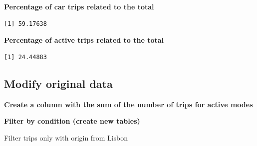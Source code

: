 \documentclass[
  letterpaper,
  DIV=11,
  numbers=noendperiod]{scrreprt}
\newenvironment{Shaded}{\begin{snugshade}}{\end{snugshade}}
\newcommand{\DecValTok}[1]{\textcolor[rgb]{0.68,0.00,0.00}{#1}}
\newcommand{\FunctionTok}[1]{\textcolor[rgb]{0.28,0.35,0.67}{#1}}
\newcommand{\NormalTok}[1]{\textcolor[rgb]{0.00,0.23,0.31}{#1}}
\newcommand{\OtherTok}[1]{\textcolor[rgb]{0.00,0.23,0.31}{#1}}
\newcommand{\SpecialCharTok}[1]{\textcolor[rgb]{0.37,0.37,0.37}{#1}}
\newcommand{\StringTok}[1]{\textcolor[rgb]{0.13,0.47,0.30}{#1}}
\begin{document}
\textbf{Percentage of car trips related to the total}

\begin{Shaded}
\end{Shaded}

\begin{verbatim}
[1] 59.17638
\end{verbatim}

\textbf{Percentage of active trips related to the total}

\begin{Shaded}
\end{Shaded}

\begin{verbatim}
[1] 24.44883
\end{verbatim}

\subsection{Modify original data}\label{modify-original-data}

\textbf{Create a column with the sum of the number of trips for active
modes}

\begin{Shaded}
\end{Shaded}

\textbf{Filter by condition (create new tables)}

Filter trips only with origin from Lisbon

\begin{Shaded}
\end{Shaded}
\end{document}
